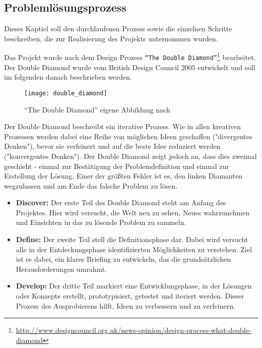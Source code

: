 \begin{newpage}
  \section{Problemlösungsprozess}
  \label{sec:problemlösungsprozess}
    Dieses Kaptiel soll den durchlaufenen Prozess sowie die einzelnen Schritte beschreiben, die zur Realisierung des Projekts unternommen wurden. 

    Das Projekt wurde nach dem Design Prozess \texttt{"`The Double Diamond"'}\footnote{\url{http://www.designcouncil.org.uk/news-opinion/design-process-what-double-diamond}} bearbeitet. Der Double Diamond wurde vom British Design Council 2005 entwickelt und soll im folgenden danach beschrieben werden.\parencite{designcouncil}

    \begin{figure}[htbp]
      \begin{center}
        \texttt{[image: double\_diamond]}
        \caption{"`The Double Diamond"' eigene Abbildung nach \parencite{designcouncil}}
        \label{fig:double_diamond}
      \end{center}
    \end{figure}

    Der Double Diamond beschreibt ein iterative Prozess. Wie in allen kreativen Prozessen werden dabei eine Reihe von möglichen Ideen geschaffen ("divergentes Denken"), bevor sie verfeinert und auf die beste Idee reduziert werden ("konvergentes Denken"). Der Double Diamond zeigt jedoch an, dass dies zweimal geschieht - einmal zur Bestätigung der Problemdefinition und einmal zur Erstellung der Lösung. Einer der größten Fehler ist es, den linken Diamanten wegzulassen und am Ende das falsche Problem zu lösen.

    \begin{itemize}[label={}]
      \item \textbf{Discover:} Der erste Teil des Double Diamond steht am Anfang des Projektes. Hier wird versucht, die Welt neu zu sehen, Neues wahrzunehmen und Einsichten in das zu lösende Problem zu sammeln.

      \item \textbf{Define:} Der zweite Teil stell die Definitionsphase dar. Dabei wird versucht alle in der Entdeckungsphase identifizierten Möglichkeiten zu verstehen. Ziel ist es dabei, ein klares Briefing zu entwickeln, das die grundsätzlichen Herausforderungen umrahmt.

      \item \textbf{Develop:} Der dritte Teil markiert eine Entwicklungsphase, in der Lösungen oder Konzepte erstellt, prototypisiert, getestet und iteriert werden. Dieser Prozess des Ausprobierens hilft, Ideen zu verbessern und zu verfeinern.


\end{itemize}
\end{newpage}
